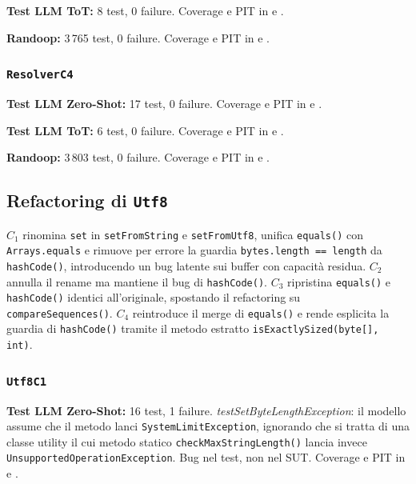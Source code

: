 \textbf{Test LLM ToT:} 8 test, 0 failure.
Coverage e PIT in  e
.

\textbf{Randoop:} 3\,765 test, 0 failure.
Coverage e PIT in  e
.

\subsubsection{\texttt{ResolverC4}}

\textbf{Test LLM Zero-Shot:} 17 test, 0 failure.
Coverage e PIT in  e
.

\textbf{Test LLM ToT:} 6 test, 0 failure.
Coverage e PIT in  e
.

\textbf{Randoop:} 3\,803 test, 0 failure.
Coverage e PIT in  e
.

\subsection{Refactoring di \texttt{Utf8}}

$C_1$ rinomina \texttt{set} in \texttt{setFromString} e
\texttt{setFromUtf8}, unifica \texttt{equals()} con
\texttt{Arrays.equals} e rimuove per errore la guardia
\texttt{bytes.length == length} da \texttt{hashCode()}, introducendo
un bug latente sui buffer con capacità residua. $C_2$ annulla il
rename ma mantiene il bug di \texttt{hashCode()}. $C_3$ ripristina
\texttt{equals()} e \texttt{hashCode()} identici all'originale,
spostando il refactoring su \texttt{compareSequences()}. $C_4$
reintroduce il merge di \texttt{equals()} e rende esplicita la
guardia di \texttt{hashCode()} tramite il metodo estratto
\texttt{isExactlySized(byte[], int)}.

\subsubsection{\texttt{Utf8C1}}

\textbf{Test LLM Zero-Shot:} 16 test, 1 failure.
\textit{testSetByteLengthException}: il modello assume che il metodo
lanci \texttt{SystemLimitException}, ignorando che si tratta di una
classe utility il cui metodo statico \texttt{checkMaxStringLength()}
lancia invece \texttt{UnsupportedOperationException}. Bug nel test,
non nel SUT.
Coverage e PIT in  e
.


